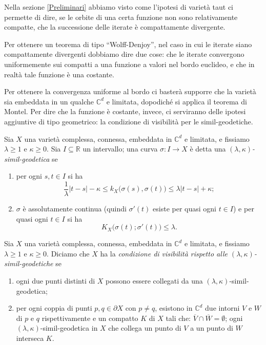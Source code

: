 Nella sezione \ref{Preliminari} abbiamo visto come l'ipotesi di varietà taut ci permette di dire, se le orbite di una certa funzione non sono relativamente compatte, che la successione delle iterate è compattamente divergente.

Per ottenere un teorema di tipo ``Wolff-Denjoy'', nel caso in cui le iterate siano compattamente divergenti dobbiamo dire due cose: che le iterate convergono uniformemente sui compatti a una funzione a valori nel bordo euclideo, e che in realtà tale funzione è una costante.

Per ottenere la convergenza uniforme al bordo ci basterà supporre che la varietà sia embeddata in un qualche $\mathbb{C}^d$ e limitata, dopodiché si applica il teorema di Montel. Per dire che la funzione è costante, invece, ci serviranno delle ipotesi aggiuntive di tipo geometrico: la condizione di visibilità per le simil-geodetiche.

\begin{defn}
    Sia $X$ una varietà complessa, connessa, embeddata in $\mathbb{C}^d$ e limitata, e fissiamo $\lambda \ge 1$ e $\kappa \ge 0$. Sia $I\subseteq \mathbb{R}$ un intervallo; una curva $\sigma:I \longrightarrow X$ è detta una \textit{$(\lambda,\kappa)$-simil-geodetica} se
    \begin{enumerate}
        \item per ogni $s,t \in I$ si ha
        \begin{equation} \label{simil-geo1}
            \frac{1}{\lambda}|t-s|-\kappa \le k_X\big(\sigma(s),\sigma(t)\big)\le\lambda|t-s|+\kappa;
        \end{equation}
        \item $\sigma$ è assolutamente continua (quindi $\sigma'(t)$ esiste per quasi ogni $t \in I$) e per quasi ogni $t \in I$ si ha
        \begin{equation} \label{simil-geo2}
            K_X\big(\sigma(t);\sigma'(t)\big) \le \lambda.
        \end{equation}
    \end{enumerate}
\end{defn}

\begin{defn} \label{visibility}
    Sia $X$ una varietà complessa, connessa, embeddata in $\mathbb{C}^d$ e limitata, e fissiamo $\lambda \ge 1$ e $\kappa \ge 0$. Diciamo che $X$ ha la \textit{condizione di visibilità rispetto alle $(\lambda,\kappa)$-simil-geodetiche} se
    \begin{enumerate}
        \item ogni due punti distinti di $X$ possono essere collegati da una $(\lambda,\kappa)$-simil-geodetica;
        \item per ogni coppia di punti $p,q\in\partial X$ con $p\not=q$, esistono in $\mathbb{C}^d$ due intorni $V$ e $W$ di $p$ e $q$ rispettivamente e un compatto $K$ di $X$ tali che: $\overline{V}\cap\overline{W}=\emptyset$; ogni $(\lambda,\kappa)$-simil-geodetica in $X$ che collega un punto di $V$ a un punto di $W$ interseca $K$.
    \end{enumerate}
\end{defn}


